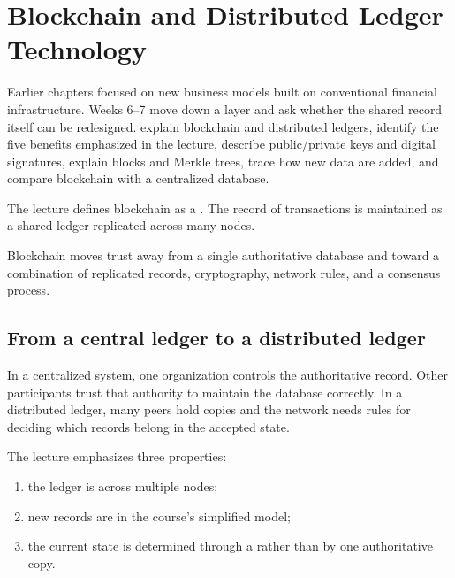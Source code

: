 \chapter{Blockchain and Distributed Ledger Technology}
\label{ch:blockchain}

\chapterguide%
  {Earlier chapters focused on new business models built on conventional financial infrastructure. Weeks 6--7 move down a layer and ask whether the shared record itself can be redesigned.}
  {explain blockchain and distributed ledgers, identify the five benefits emphasized in the lecture, describe public/private keys and digital signatures, explain blocks and Merkle trees, trace how new data are added, and compare blockchain with a centralized database.}

The lecture defines blockchain as a . The record of transactions is maintained as a shared ledger replicated across many nodes.

\begin{keyidea}
Blockchain moves trust away from a single authoritative database and toward a combination of replicated records, cryptography, network rules, and a consensus process.
\end{keyidea}

\section{From a central ledger to a distributed ledger}

In a centralized system, one organization controls the authoritative record. Other participants trust that authority to maintain the database correctly. In a distributed ledger, many peers hold copies and the network needs rules for deciding which records belong in the accepted state.

The lecture emphasizes three properties:

\begin{enumerate}
  \item the ledger is  across multiple nodes;
  \item new records are  in the course's simplified model;
  \item the current state is determined through a  rather than by one authoritative copy.
\end{enumerate}

